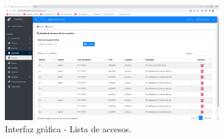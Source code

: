 \vspace{-0.6cm} %


 \begin{figure}[!h] %
	\caption[Interfaz gráfica - Lista de accesos]
	{\newline Interfaz gráfica - Lista de accesos.} %
	\centering
	\includegraphics[width=0.83\textwidth]{imagenes/cap_3/Img_calibus/CALIBUS18.png} %
	
	\begin{flushleft}
	\end{flushleft}
	\vspace{-16pt}
	\label{fig:cali41} %
\end{figure}

\vspace{-0.6cm} %
